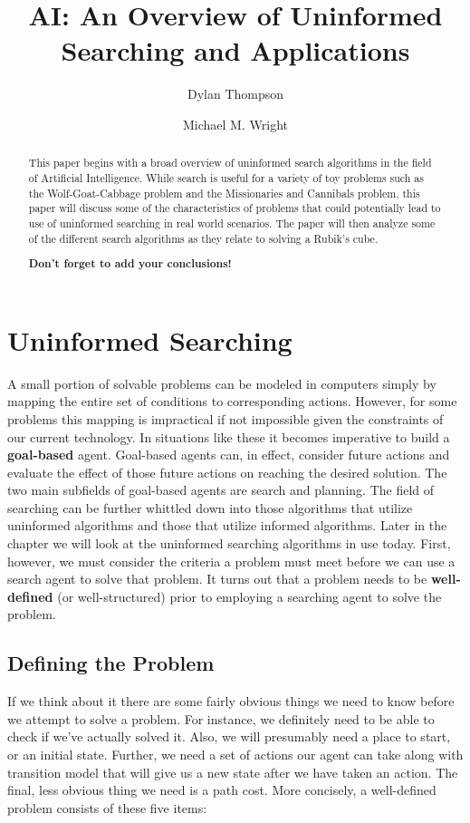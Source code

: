 \documentclass[a4paper,11pt]{report}
\title{AI: An Overview of Uninformed Searching and Applications}
\author{Dylan Thompson \and Michael M. Wright}
\begin{document}
\maketitle
\tableofcontents

\begin{abstract}
This paper begins with a broad overview of uninformed search algorithms in the
field of Artificial Intelligence.  While search is useful for a variety of toy
problems such as the Wolf-Goat-Cabbage problem and the Missionaries and
Cannibals problem, this paper will discuss some of the characteristics of
problems that could potentially lead to use of uninformed searching in real
world scenarios.  The paper will then analyze some of the different search
algorithms as they relate to solving a Rubik's cube.

\textbf{Don't forget to add your conclusions!}

\end{abstract}

\chapter{Uninformed Searching}
A small portion of solvable problems can be modeled in computers simply by
mapping the entire set of conditions to corresponding actions.  However, for
some problems this mapping is impractical if not impossible given the
constraints of our current technology.  In situations like these it becomes
imperative to build a \textbf{goal-based} agent.  Goal-based agents can, in
effect, consider future actions and evaluate the effect of those future
actions on reaching the desired solution.\cite{norvig}  The two main
subfields of goal-based agents are search and planning.\cite{wikiAgent} The
field of searching can be further whittled down into those algorithms that
utilize uninformed algorithms and those that utilize informed algorithms.
Later in the chapter we will look at the uninformed searching algorithms in
use today.  First, however, we must consider the criteria a problem must meet
before we can use a search agent to solve that problem.  It turns out that a
problem needs to be \textbf{well-defined} (or well-structured) prior to 
employing a searching agent to solve the problem.\cite{shun}

\section{Defining the Problem}
If we think about it there are some fairly obvious things we need to know
before we attempt to solve a problem.  For instance, we definitely need to be
able to check if we've actually solved it.  Also, we will presumably need a
place to start, or an initial state. Further, we need a set of actions our 
agent can take along with transition model that will give us a new state after
we have taken an action.  The final, less obvious thing we need is a path cost.
\cite{norvig}  More concisely, a well-defined problem consists of these
five items:
\end{document}
